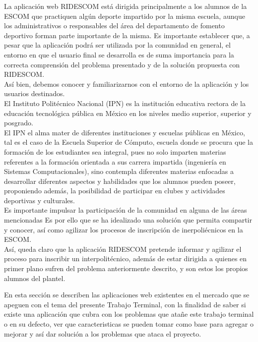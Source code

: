 \noindent La aplicación web RIDESCOM está dirigida principalmente a los alumnos de la ESCOM que practiquen algún deporte impartido por la misma escuela, aunque los administrativos o responsables del área del departamento de fomento deportivo forman parte importante de la misma. Es importante establecer que, a pesar que la aplicación podrá ser utilizada por la comunidad en general,  el entorno en que el usuario final se desarrolla es de suma importancia para la correcta comprensión del problema presentado y de la solución propuesta con RIDESCOM.\\ 
Así bien, debemos conocer y familiarizarnos con el entorno de la aplicación y los usuarios destinados. \\
El Instituto Politécnico Nacional (IPN) es la institución educativa rectora de la educación tecnológica pública en México en los niveles medio superior, superior y posgrado. \cite{hist} \\

El IPN el alma mater de diferentes instituciones y escuelas públicas en México, tal es el caso de la Escuela Superior de Cómputo, escuela donde se procura que la formación de los estudiantes sea integral, pues no solo imparten materias referentes a la formación orientada a sus carrera impartida (ingeniería en Sistemas Computacionales), sino contempla diferentes materias enfocadas a desarrollar diferentes aspectos y habilidades que los alumnos pueden poseer, proponiendo además, la posibilidad de participar en clubes y actividades deportivas y culturales. \\ 
Es importante impulsar la participación de la comunidad en alguna de las áreas mencionadas 
Es por ello que se ha idealizado una solución que permita compartir y conocer, así como agilizar los procesos de inscripción de inerpoliécnicos en la ESCOM.\\ %
Así, queda claro que la aplicación RIDESCOM pretende informar y agilizar el proceso para inscribir un interpolitécnico, además de estar dirigida a quienes en primer plano sufren del problema anteriormente descrito, y son estos los propios alumnos del plantel.


\noindent En esta sección se describen las aplicaciones web existentes en el mercado que se apeguen con el tema del presente Trabajo Terminal, con la finalidad de saber si existe una aplicación que cubra con los problemas que atañe este trabajo terminal o en su defecto, ver que caracteristicas se pueden tomar como base para agregar o mejorar y así dar solución a los problemas que ataca el proyecto. 


